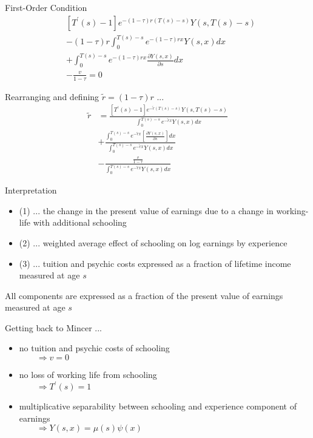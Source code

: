 \begin{frame}
First-Order Condition
\begin{align*}
& [T^\prime(s) - 1]e^{-(1 - \tau)r(T(s) - s)} Y(s, T(s) - s) \\
& - (1 - \tau)r\int^{T(s) - s}_0 e^{-(1 - \tau)rx} Y(s, x)dx \\
& + \int_0^{T(s) - s} e^{-(1 - \tau) rx} \frac{\partial Y(s, x)}{\partial s}dx \\
& - \frac{v}{ 1  -\tau} = 0
\end{align*}
\end{frame}


\begin{frame}
Rearranging and defining $\tilde{r} = (1 - \tau)r$ ...
\begin{align}
\tilde{r} & = \frac{[T^\prime(s) - 1]e^{-\tilde{r}(T(s) - s)}Y(s, T(s) - s )}{\int_0^{T(s) - s} e^{-\tilde{r}x}Y(s, x) dx} \\
          & + \frac{\int_0^{T(s) - s}e^{-\tilde{r}x}\left[\frac{\partial Y(s, x)}{\partial s}\right] dx}{\int_0^{T(s) - s}e^{-\tilde{r}x}Y(s, x) dx} \\
          & - \frac{\frac{v}{1-\tau}}{\int_0^{T(s) - s}e^{-\tilde{r}x}Y(s, x)dx}
\end{align}
\end{frame}

\begin{frame}
Interpretation
\begin{itemize}
\item (1) ... the change in the present value of earnings due to a change in working-life with additional schooling
\item (2) ... weighted average effect of schooling on log earnings by experience
\item (3) ... tuition and psychic costs expressed as a fraction of lifetime income measured at age $s$
\end{itemize}
All components are expressed as a fraction of the present value of earnings measured at age $s$
\end{frame}


\begin{frame}
Getting back to Mincer ...
\begin{itemize}
\item no tuition and psychic costs of schooling \\
    $\qquad\Rightarrow v = 0$
\item no loss of working life from schooling \\
    $\qquad\Rightarrow T^\prime(s) = 1$
\item multiplicative separability between schooling and experience component of earnings \\
    $\qquad\Rightarrow Y(s, x) = \mu(s)\psi(x)$
\end{itemize}
\end{frame}


